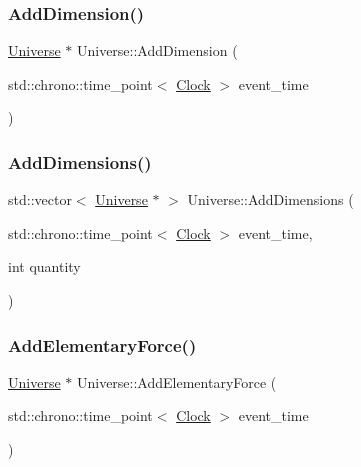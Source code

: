 \mbox{\label{classUniverse_a6326158c47bf3f7fe9297299a9b5b7b7}} 
\subsubsection{\texorpdfstring{Add\+Dimension()}{AddDimension()}}
{\footnotesize\ttfamily \mbox{\hyperlink{classUniverse}{Universe}} $\ast$ Universe\+::\+Add\+Dimension (\begin{DoxyParamCaption}\item[{std\+::chrono\+::time\+\_\+point$<$ \mbox{\hyperlink{universe_8h_a0ef8d951d1ca5ab3cfaf7ab4c7a6fd80}{Clock}} $>$}]{event\+\_\+time }\end{DoxyParamCaption})}

\mbox{\label{classUniverse_a03bdf5f7fea4209241e9bf5316d45517}} 
\subsubsection{\texorpdfstring{Add\+Dimensions()}{AddDimensions()}}
{\footnotesize\ttfamily std\+::vector$<$ \mbox{\hyperlink{classUniverse}{Universe}} $\ast$ $>$ Universe\+::\+Add\+Dimensions (\begin{DoxyParamCaption}\item[{std\+::chrono\+::time\+\_\+point$<$ \mbox{\hyperlink{universe_8h_a0ef8d951d1ca5ab3cfaf7ab4c7a6fd80}{Clock}} $>$}]{event\+\_\+time,  }\item[{int}]{quantity }\end{DoxyParamCaption})}

\mbox{\label{classUniverse_a90c573dec55f2b3ad5680015356f5f25}} 
\subsubsection{\texorpdfstring{Add\+Elementary\+Force()}{AddElementaryForce()}}
{\footnotesize\ttfamily \mbox{\hyperlink{classUniverse}{Universe}} $\ast$ Universe\+::\+Add\+Elementary\+Force (\begin{DoxyParamCaption}\item[{std\+::chrono\+::time\+\_\+point$<$ \mbox{\hyperlink{universe_8h_a0ef8d951d1ca5ab3cfaf7ab4c7a6fd80}{Clock}} $>$}]{event\+\_\+time }\end{DoxyParamCaption})}

